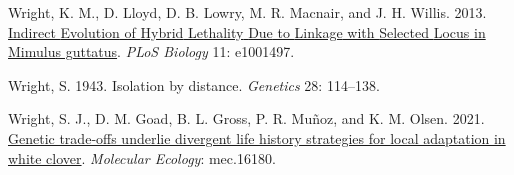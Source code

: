 \documentclass[
  12pt,
]{article}
\newlength{\cslhangindent}
\newlength{\cslentryspacingunit} %
\newenvironment{CSLReferences}[2] %
 {%
  \setlength{\parindent}{0pt}
  \ifodd #1
  \let\oldpar\par
  \def\par{\hangindent=\cslhangindent\oldpar}
  \fi
  \setlength{\parskip}{#2\cslentryspacingunit}
 }%
 {}
\begin{document}
\begin{CSLReferences}{1}{0}
\leavevmode{}%
Wright, K. M., D. Lloyd, D. B. Lowry, M. R. Macnair, and J. H. Willis. 2013. \href{https://doi.org/10.1371/journal.pbio.1001497}{Indirect {Evolution} of {Hybrid} {Lethality} {Due} to {Linkage} with {Selected} {Locus} in {Mimulus} guttatus}. \emph{PLoS Biology} 11: e1001497.

\leavevmode{}%
Wright, S. 1943. Isolation by distance. \emph{Genetics} 28: 114--138.

\leavevmode{}%
Wright, S. J., D. M. Goad, B. L. Gross, P. R. Muñoz, and K. M. Olsen. 2021. \href{https://doi.org/10.1111/mec.16180}{Genetic trade‐offs underlie divergent life history strategies for local adaptation in white clover}. \emph{Molecular Ecology}: mec.16180.

\end{CSLReferences}
\end{document}
